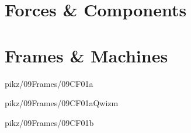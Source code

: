 \documentclass[9pt,xcolor={svgnames, x11names}]{beamer}
\begin{document}
\section{Forces \& Components}










\section{Frames \& Machines}


\begin{frame}{pikz/09Frames/09CF01a}
	
\end{frame}


\begin{frame}{pikz/09Frames/09CF01aQwizm}
	
\end{frame}


\begin{frame}{pikz/09Frames/09CF01b}
	
\end{frame}
\end{document}

